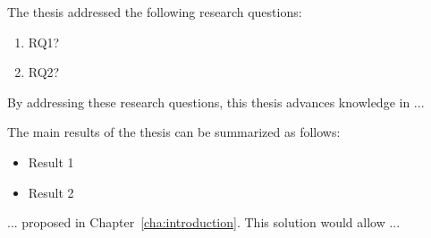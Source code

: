 The thesis addressed the following research questions:
\begin{enumerate}
  \item RQ1?
  \item RQ2?
\end{enumerate}
By addressing these research questions, this thesis advances knowledge in ...

The main results of the thesis can be summarized as follows:
\begin{itemize}
  \item Result 1
  \item Result 2
\end{itemize}

... proposed in Chapter~\ref{cha:introduction}. This solution would allow ...